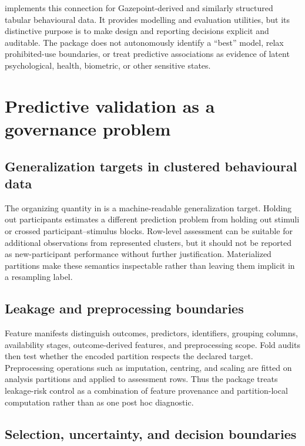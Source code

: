 \documentclass[article]{jss}
\begin{document}
 \citep{gp3ml2026} implements this connection for Gazepoint-derived and
similarly structured tabular behavioural data. It provides modelling and evaluation
utilities, but its distinctive purpose is to make design and reporting decisions
explicit and auditable. The package does not autonomously identify a ``best'' model,
relax prohibited-use boundaries, or treat predictive associations as evidence of
latent psychological, health, biometric, or other sensitive states.

\section{Predictive validation as a governance problem}
\label{sec:governance-problem}

\subsection{Generalization targets in clustered behavioural data}

The organizing quantity in  is a machine-readable generalization target.
Holding out participants estimates a different prediction problem from holding out
stimuli or crossed participant--stimulus blocks. Row-level assessment can be suitable
for additional observations from represented clusters, but it should not be reported
as new-participant performance without further justification. Materialized partitions
make these semantics inspectable rather than leaving them implicit in a resampling
label.

\subsection{Leakage and preprocessing boundaries}

Feature manifests distinguish outcomes, predictors, identifiers, grouping columns,
availability stages, outcome-derived features, and preprocessing scope. Fold audits
then test whether the encoded partition respects the declared target. Preprocessing
operations such as imputation, centring, and scaling are fitted on analysis partitions
and applied to assessment rows. Thus the package treats leakage-risk control as a
combination of feature provenance and partition-local computation rather than as one
post hoc diagnostic.

\subsection{Selection, uncertainty, and decision boundaries}
\end{document}

